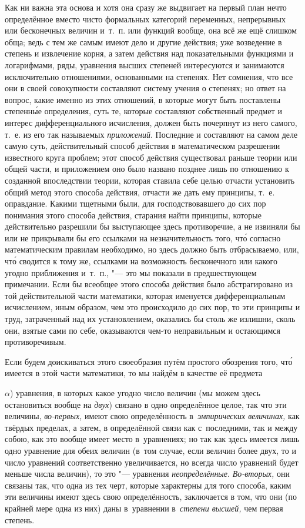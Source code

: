 Как ни важна эта основа и хотя она сразу же выдвигает на первый план нечто
определённое вместо чисто формальных категорий переменных, непрерывных или
бесконечных величин и~т.~п. или функций вообще, она всё же ещё слишком обща;
ведь с тем же самым имеют дело и другие действия; уже возведение в степень и
извлечение корня, а затем действия над показательными функциями и логарифмами,
ряды, уравнения высших степеней интересуются и занимаются исключительно
отношениями, основанными на степенях. Нет сомнения, что все они в своей
совокупности составляют систему учения о степенях; но ответ на вопрос, какие
именно из этих отношений, в которые могут быть поставлены степенн\'{ы}е
определения, суть те, которые составляют собственный предмет и интерес
дифференциального исчисления, должен быть почерпнут из него самого, т.~е. из
его так называемых {\em приложений}. Последние и составляют на самом деле самую
суть, действительный способ действия в математическом разрешении известного
круга проблем; этот способ действия существовал раньше теории или общей части,
и приложением оно было названо позднее лишь по отношению к созданной
впоследствии теории, которая ставила себе целью отчасти установить общий метод
этого способа действия, отчасти же дать ему принципы, т.~е. оправдание. Какими
тщетными были, для господствовавшего до сих пор понимания этого способа
действия, старания найти принципы, которые действительно разрешили бы
выступающее здесь противоречие, а не извиняли бы или не прикрывали бы его
ссылками на незначительность того, чт\'{о} согласно математическим правилам
необходимо, но здесь должно быть отбрасываемо, или, чт\'{о} сводится к тому же,
ссылками на возможность бесконечного или какого угодно приближения и~т.~п.,
"--- это мы показали в предшествующем примечании. Если бы всеобщее этого
способа действия было абстрагировано из той действительной части математики,
которая именуется дифференциальным исчислением, иным образом, чем это
происходило до сих пор, то эти принципы и труд, затраченный над их
установлением, оказались бы столь же излишни, сколь они, взятые сами по себе,
оказываются чем-то неправильным и остающимся противоречивым.

Если будем доискиваться этого своеобразия путём простого обозрения того,
чт\'{о} имеется в этой части математики, то мы найдём в качестве её предмета

$\alpha$) уравнения, в которых какое угодно число величин (мы можем здесь
остановиться вообще на {\em двух}) связано в одно определённое целое, так что
эти величины, {\em во-первых,} имеют свою определённость
в~{\em эмпирических величинах,} как твёрдых пределах, а затем, в определённой
связи как с~последними, так и между собою, как это вообще имеет место
в~уравнениях; но так как здесь имеется лишь одно уравнение для обеих величин
(в~том случае, если величин более двух, то и число уравнений соответственно
увеличивается, но всегда число уравнений будет меньше числа величин), то это
"--- уравнения {\em неопределённые}. {\em Во-вторых,} они связаны так, что одна
из тех черт, которые характерны для того способа, каким эти величины имеют
здесь свою определённость, заключается в том, что они (по крайней мере одна из
них) даны в~уравнении в~{\em степени высшей,} чем первая степень.

